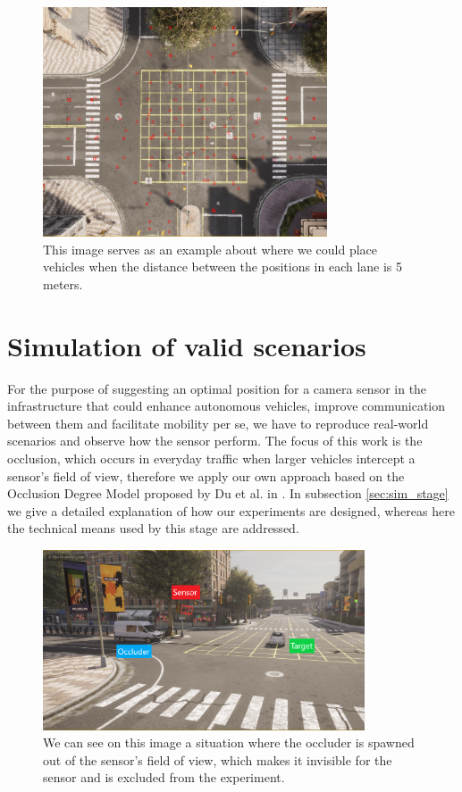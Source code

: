 \begin{figure} [h!]
    \centering
    \includegraphics[width=0.75\textwidth]{images/waypoints_target.png}
    \caption[Vehicle waypoints with specified distance]{This image serves as an example about where we could place vehicles when the distance between the positions in each lane is 5 meters.}
    \label{fig:distance_waypoints}
\end{figure}

\section{Simulation of valid scenarios}
For the purpose of suggesting an optimal position for a camera sensor in the infrastructure that could enhance autonomous vehicles, improve communication between them and facilitate mobility per se, we have to reproduce real-world scenarios and observe how the sensor perform. The focus of this work is the occlusion, which occurs in everyday traffic when larger vehicles intercept a sensor's field of view, therefore we apply our own approach based on the Occlusion Degree Model proposed by Du et al. in \cite{occlusion_degree_model}. In subsection \ref{sec:sim_stage} we give a detailed explanation of how our experiments are designed, whereas here the technical means used by this stage are addressed.

\begin{figure} [h!]
    \centering
    \includegraphics[width=0.85\textwidth]{images/behind_sensor.png}
    \caption[Vehicle spawned behind the camera]{We can see on this image a situation where the occluder is spawned out of the sensor's field of view, which makes it invisible for the sensor and is excluded from the experiment.}
    \label{fig:behind_sensor}
\end{figure}

